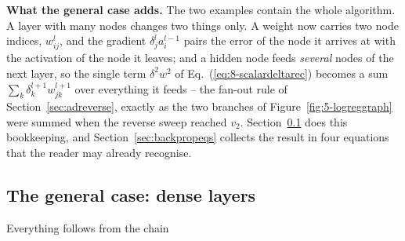\begin{notebox}
\textbf{What the general case adds.}  The two examples contain the whole
algorithm.  A layer with many nodes changes two things only.  A weight now
carries two node indices, $w_{ij}^{l}$, and the gradient
$\delta_j^{l}a_i^{l-1}$ pairs the error of the node it arrives at with the
activation of the node it leaves; and a hidden node feeds \emph{several}
nodes of the next layer, so the single term $\delta^{2}w^{2}$ of
Eq.~(\ref{eq:8-scalardeltarec}) becomes a sum $\sum_k\delta_k^{l+1}w_{jk}^{l+1}$
over everything it feeds -- the fan-out rule of Section~\ref{sec:adreverse},
exactly as the two branches of Figure~\ref{fig:5-logreggraph} were summed
when the reverse sweep reached $v_2$.  Section~\ref{sec:backpropgeneral} does
this bookkeeping, and Section~\ref{sec:backpropeqs} collects the result in
four equations that the reader may already recognise.
\end{notebox}

\subsection{The general case: dense layers}
\label{sec:backpropgeneral}

Everything follows from the chain
